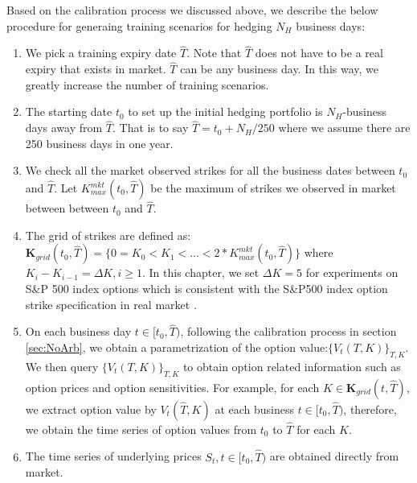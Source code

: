 \documentclass[letterpaper,12pt,titlepage,oneside,final]{book}
\numberwithin{equation}{section}
\theoremstyle{definition}
\newcommand{\Vmkt}{V^{mkt}}
\begin{document}
Based on the calibration process we discussed above, we describe the below procedure for generaing  training scenarios for hedging $N_H$ business days:
\begin{enumerate}
		\item We pick a training expiry date $\widehat{T}$. Note that  $\widehat{T}$ does not have to be a real expiry that exists in market. $\widehat{T}$ can be any business day. In this way, we greatly increase the number of training scenarios.
		\item The starting date $t_0$ to set up the initial hedging portfolio is  $N_H$-business days away from $\widehat{T}$. That is to say $\widehat{T}=t_0+N_H/250$ where we assume there are 250 business days in one year. 
		\item We check all the market observed strikes for all the business dates between $t_0$ and  $\widehat{T}$. Let $K^{mkt}_{max}(t_0,\widehat{T})$ be the maximum of  strikes we observed in market between between $t_0$ and  $\widehat{T}$. 
		\item  The grid of strikes are defined as: $\mathbf{K}_{grid}(t_0,\widehat{T})=\{0=K_0<K_1<\dots<2*K^{mkt}_{max}(t_0,\widehat{T})\}$ where $K_i-K_{i-1}=\Delta K, i \geq 1$. In this chapter, we set $\Delta K=5$ for experiments on S\&P 500 index options which is consistent with the S\&P500 index option strike specification in real market \cite{hull2006options}.
		\item On each business day $t \in [t_0,\widehat{T})$, following the calibration process in section \ref{sec:NoArb}, we  obtain a parametrization of the option value:$\{V_{t}(T,K)\}_{T,K}$. We then query $\{V_{t}(T,K)\}_{T,K}$ to obtain  option related information such as option prices and option sensitivities. For example, for each $K \in \mathbf{K}_{grid}(t,\widehat{T})$, we extract option value by $V_{t}(\widehat{T},K)$ at each business $t \in [t_0,\widehat{T})$, therefore, we obtain the time series of option values from $t_0$ to $\widehat{T}$ for each $K$.
		\item The time series of underlying prices $S_t, t \in[t_0,\widehat{T})$ are obtained directly from market. 
	\end{enumerate}
	
	
	
\end{document}
